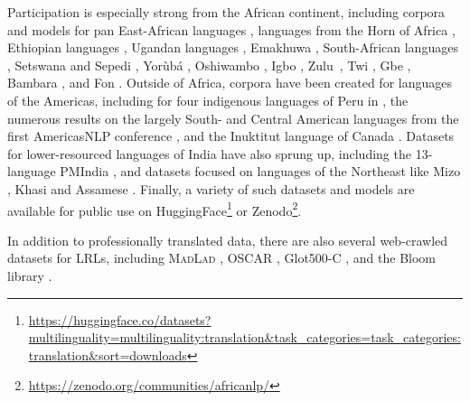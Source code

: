 Participation is especially strong from the African continent, including corpora and models for pan East-African languages \citep{babirye2022building}, languages from the Horn of Africa \citep{hornmt}, Ethiopian languages \citep{teferra-abate-etal-2018-parallel,gezmu2021extended}, Ugandan languages \citep{akera2022machine}, Emakhuwa \citep{felermino2021towards},  South-African languages \citep{eiselen-puttkammer-2014-developing}, Setswana and Sepedi \citep{marivate-etal-2020-investigating}, Yorùbá \citep{adelani-etal-2021-effect,adelani2021menyo},  Oshiwambo \citep{nekoto2022participatory}, Igbo \citep{ezeani2020igbo},
Zulu~\citep{rooweither_mabuya_2021_5035171},
Twi \citep{azunre2021english}, Gbe \citep{hacheme2021english2gbe}, Bambara \citep{tapo2021domain}, and Fon \citep{emezue-dossou-2020-ffr}. Outside of Africa, corpora have been created for languages of the Americas, including for four indigenous languages of Peru in \citet{bustamante-etal-2020-data}, the numerous results on the largely South- and Central American languages from the first AmericasNLP conference \citep{mager-etal-2021-findings}, and the Inuktitut language of Canada \citep{joanis-etal-2020-nunavut}. Datasets for lower-resourced languages of India have also sprung up, including the 13-language PMIndia \citep{haddow2020pmindia}, and datasets focused on languages of the Northeast like Mizo \citep{thihlum2020mizo}, Khasi \citep{laskar-etal-2021-enkhcorp1} and Assamese \citep{laskar-etal-2020-enascorp1}. Finally, a variety of such datasets and models are available for public use on HuggingFace\footnote{\url{https://huggingface.co/datasets?multilinguality=multilinguality:translation&task_categories=task_categories:translation&sort=downloads}} or Zenodo\footnote{\url{https://zenodo.org/communities/africanlp/}}.


In addition to professionally translated data, there are also several web-crawled datasets for LRLs, including
\textsc{MadLad} \citep{Kudugunta2023},
OSCAR \citep{oscar},
Glot500-C \citep{imanigooghari-etal-2023-glot500}, 
and the Bloom library \citep{leong-etal-2022-bloom}.